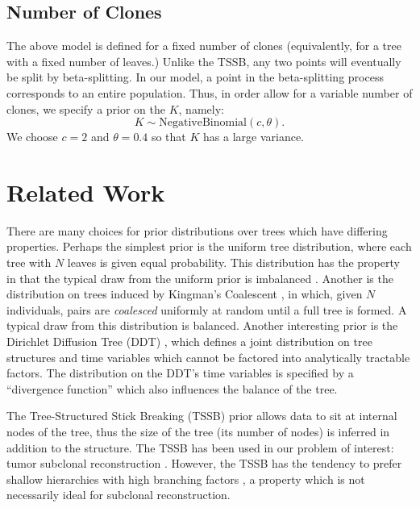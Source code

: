 \documentclass{bioinfo}
\newcommand{\NegativeBinomial}{\mathrm{NegativeBinomial}}
\begin{document}
\begin{methods}
\subsection{Number of Clones}
The above model is defined for a fixed number of clones (equivalently, for a tree with a fixed number of leaves.)  Unlike the TSSB, any two points will eventually be split by beta-splitting.  In our model, a point in the beta-splitting process corresponds to an entire population.  Thus, in order allow for a variable number of clones, we specify a prior on the $K$, namely:
\begin{equation}
K \sim \NegativeBinomial(c,\theta). 
\end{equation}
We choose $c=2$ and $\theta=0.4$ so that $K$ has a large variance. 

\section{Related Work}
\label{sec:related}

There are many choices for prior distributions over trees which have differing properties.  Perhaps the simplest prior is the uniform tree distribution, where each tree with $N$ leaves is given equal probability.  This distribution has the property in that the typical draw from the uniform prior is imbalanced \cite{Aldous1995}.  Another is the distribution on trees induced by Kingman's Coalescent \cite{Kingman82g}, in which, given $N$ individuals, pairs are \emph{coalesced} uniformly at random until a full tree is formed.  A typical draw from this distribution is balanced.  Another interesting prior is the Dirichlet Diffusion Tree (DDT) \cite{neal2003dft}, which defines a joint distribution on tree structures and time variables which cannot be factored into analytically tractable factors.  The distribution on the DDT's time variables is specified by a ``divergence function'' which also influences the balance of the tree. 

The Tree-Structured Stick Breaking (TSSB) \cite{adams2010tssb} prior allows data to sit at internal nodes of the tree, thus the size of the tree (its number of nodes) is inferred in addition to the structure.  The TSSB has been used in our problem of interest: tumor subclonal reconstruction \cite{Jiao2014}.  However, the TSSB has the tendency to prefer shallow hierarchies with high branching factors \cite{steinhardt2012martingale}, a property which is not necessarily ideal for subclonal reconstruction. 




\end{methods}
\end{document}
